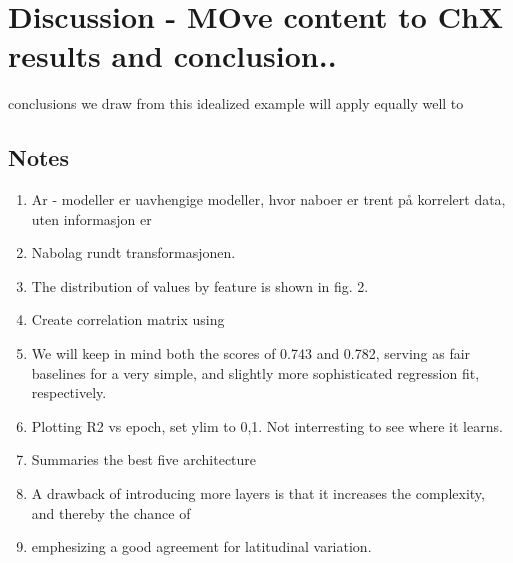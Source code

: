 \chapter{Discussion - MOve content to ChX results and conclusion..}
conclusions we draw from this idealized example will apply equally well to
\section{Notes}
\begin{enumerate}
    \item Ar - modeller er uavhengige modeller, hvor naboer er trent på korrelert data, uten informasjon er
    \item Nabolag rundt transformasjonen. 
    \item The distribution of values
    by feature is shown in fig. 2.
    \item Create correlation matrix using 
    \item We will keep in mind both the scores of 0.743 and 0.782, serving
    as fair baselines for a very simple, and slightly more sophisticated
    regression fit, respectively.
    \item Plotting R2 vs epoch, set ylim to 0,1. Not interresting to see where it learns.
    \item Summaries the best five architecture 
    \item A drawback of introducing more layers
    is that it increases the complexity, and thereby the chance of
    \item emphesizing a good agreement for latitudinal variation.
\end{enumerate}

